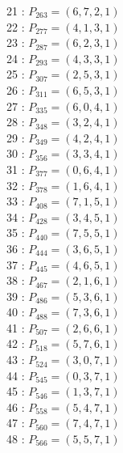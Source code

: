 \documentclass{article}
\begin{document}
{\begin{multicols}{2}
21 : $P_{263}=( 6, 7, 2, 1 )$\\
22 : $P_{277}=( 4, 1, 3, 1 )$\\
23 : $P_{287}=( 6, 2, 3, 1 )$\\
24 : $P_{293}=( 4, 3, 3, 1 )$\\
25 : $P_{307}=( 2, 5, 3, 1 )$\\
26 : $P_{311}=( 6, 5, 3, 1 )$\\
27 : $P_{335}=( 6, 0, 4, 1 )$\\
28 : $P_{348}=( 3, 2, 4, 1 )$\\
29 : $P_{349}=( 4, 2, 4, 1 )$\\
30 : $P_{356}=( 3, 3, 4, 1 )$\\
31 : $P_{377}=( 0, 6, 4, 1 )$\\
32 : $P_{378}=( 1, 6, 4, 1 )$\\
33 : $P_{408}=( 7, 1, 5, 1 )$\\
34 : $P_{428}=( 3, 4, 5, 1 )$\\
35 : $P_{440}=( 7, 5, 5, 1 )$\\
36 : $P_{444}=( 3, 6, 5, 1 )$\\
37 : $P_{445}=( 4, 6, 5, 1 )$\\
38 : $P_{467}=( 2, 1, 6, 1 )$\\
39 : $P_{486}=( 5, 3, 6, 1 )$\\
40 : $P_{488}=( 7, 3, 6, 1 )$\\
41 : $P_{507}=( 2, 6, 6, 1 )$\\
42 : $P_{518}=( 5, 7, 6, 1 )$\\
43 : $P_{524}=( 3, 0, 7, 1 )$\\
44 : $P_{545}=( 0, 3, 7, 1 )$\\
45 : $P_{546}=( 1, 3, 7, 1 )$\\
46 : $P_{558}=( 5, 4, 7, 1 )$\\
47 : $P_{560}=( 7, 4, 7, 1 )$\\
48 : $P_{566}=( 5, 5, 7, 1 )$\\
\end{multicols}
}
\end{document}
